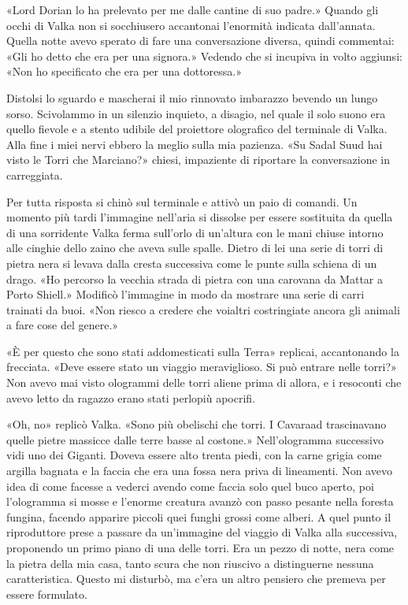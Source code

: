 «Lord Dorian lo ha prelevato per me dalle cantine di suo padre.» Quando
gli occhi di Valka non si socchiusero accantonai l'enormità indicata
dall'annata. Quella notte avevo sperato di fare una conversazione
diversa, quindi commentai: «Gli ho detto che era per una signora.»
Vedendo che si incupiva in volto aggiunsi: «Non ho specificato che era
per una dottoressa.»

Distolsi lo sguardo e mascherai il mio rinnovato imbarazzo bevendo un
lungo sorso. Scivolammo in un silenzio inquieto, a disagio, nel quale il
solo suono era quello fievole e a stento udibile del proiettore
olografico del terminale di Valka. Alla fine i miei nervi ebbero la
meglio sulla mia pazienza. «Su Sadal Suud hai visto le Torri che
Marciano?» chiesi, impaziente di riportare la conversazione in
carreggiata.

Per tutta risposta si chinò sul terminale e attivò un paio di comandi.
Un momento più tardi l'immagine nell'aria si dissolse per essere
sostituita da quella di una sorridente Valka ferma sull'orlo di
un'altura con le mani chiuse intorno alle cinghie dello zaino che aveva
sulle spalle. Dietro di lei una serie di torri di pietra nera si levava
dalla cresta successiva come le punte sulla schiena di un drago. «Ho
percorso la vecchia strada di pietra con una carovana da Mattar a Porto
Shiell.» Modificò l'immagine in modo da mostrare una serie di carri
trainati da buoi. «Non riesco a credere che voialtri costringiate ancora
gli animali a fare cose del genere.»

«È per questo che sono stati addomesticati sulla Terra» replicai,
accantonando la frecciata. «Deve essere stato un viaggio meraviglioso.
Si può entrare nelle torri?» Non avevo mai visto ologrammi delle torri
aliene prima di allora, e i resoconti che avevo letto da ragazzo erano
stati perlopiù apocrifi.

«Oh, no» replicò Valka. «Sono più obelischi che torri. I Cavaraad
trascinavano quelle pietre massicce dalle terre basse al costone.»
Nell'ologramma successivo vidi uno dei Giganti. Doveva essere alto
trenta piedi, con la carne grigia come argilla bagnata e la faccia che
era una fossa nera priva di lineamenti. Non avevo idea di come facesse a
vederci avendo come faccia solo quel buco aperto, poi l'ologramma si
mosse e l'enorme creatura avanzò con passo pesante nella foresta
fungina, facendo apparire piccoli quei funghi grossi come alberi. A quel
punto il riproduttore prese a passare da un'immagine del viaggio di
Valka alla successiva, proponendo un primo piano di una delle torri. Era
un pezzo di notte, nera come la pietra della mia casa, tanto scura che
non riuscivo a distinguerne nessuna caratteristica. Questo mi disturbò,
ma c'era un altro pensiero che premeva per essere formulato.

